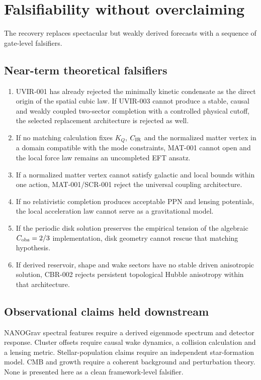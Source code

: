 \section{Falsifiability without overclaiming}

The recovery replaces spectacular but weakly derived forecasts with a sequence
of gate-level falsifiers.

\subsection{Near-term theoretical falsifiers}

\begin{enumerate}
\item UVIR-001 has already rejected the minimally kinetic condensate as the
direct origin of the spatial cubic law.  If UVIR-003 cannot produce a stable,
causal and weakly coupled two-sector completion with a controlled physical
cutoff, the selected replacement architecture is rejected as well.
\item If no matching calculation fixes $K_Q$, $C_{\rm IR}$ and the normalized
matter vertex in a domain compatible with the mode constraints, MAT-001 cannot
open and the local force law remains an uncompleted EFT ansatz.
\item If a normalized matter vertex cannot satisfy galactic and local bounds
within one action, MAT-001/SCR-001 reject the universal coupling architecture.
\item If no relativistic completion produces acceptable PPN and lensing
potentials, the local acceleration law cannot serve as a gravitational model.
\item If the periodic disk solution preserves the empirical tension of the
algebraic $C_{\rm obs}=2/3$ implementation, disk geometry cannot rescue that
matching hypothesis.
\item If derived reservoir, shape and wake sectors have no stable driven
anisotropic solution, CBR-002 rejects persistent topological Hubble anisotropy
within that architecture.
\end{enumerate}

\subsection{Observational claims held downstream}

NANOGrav spectral features require a derived eigenmode spectrum and detector
response.  Cluster offsets require causal wake dynamics, a collision
calculation and a lensing metric.  Stellar-population claims require an
independent star-formation model.  CMB and growth require a coherent background
and perturbation theory.  None is presented here as a clean framework-level
falsifier.

